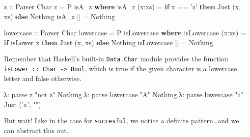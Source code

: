\documentclass[]{article}
\newenvironment{Shaded}{}{}
\newcommand{\KeywordTok}[1]{\textcolor[rgb]{0.00,0.44,0.13}{\textbf{{#1}}}}
\newcommand{\DataTypeTok}[1]{\textcolor[rgb]{0.56,0.13,0.00}{{#1}}}
\newcommand{\CharTok}[1]{\textcolor[rgb]{0.25,0.44,0.63}{{#1}}}
\newcommand{\StringTok}[1]{\textcolor[rgb]{0.25,0.44,0.63}{{#1}}}
\newcommand{\OtherTok}[1]{\textcolor[rgb]{0.00,0.44,0.13}{{#1}}}
\newcommand{\FunctionTok}[1]{\textcolor[rgb]{0.02,0.16,0.49}{{#1}}}
\newcommand{\NormalTok}[1]{{#1}}
\begin{document}
\begin{Shaded}
\begin{Highlighting}[]
\OtherTok{z ::} \DataTypeTok{Parser} \DataTypeTok{Char}
\NormalTok{z }\FunctionTok{=} \DataTypeTok{P} \NormalTok{isA_z}
    \KeywordTok{where}
        \NormalTok{isA_z (x}\FunctionTok{:}\NormalTok{xs) }\FunctionTok{=}  \KeywordTok{if} \NormalTok{x }\FunctionTok{==} \CharTok{'z'}
                            \KeywordTok{then} \DataTypeTok{Just} \NormalTok{(x, xs)}
                            \KeywordTok{else} \DataTypeTok{Nothing}
        \NormalTok{isA_z []     }\FunctionTok{=}  \DataTypeTok{Nothing}

\OtherTok{lowercase ::} \DataTypeTok{Parser} \DataTypeTok{Char}
\NormalTok{lowercase }\FunctionTok{=} \DataTypeTok{P} \NormalTok{isLowercase}
    \KeywordTok{where}
        \NormalTok{isLowercase (x}\FunctionTok{:}\NormalTok{xs)  }\FunctionTok{=}   \KeywordTok{if} \NormalTok{isLower x}
                                    \KeywordTok{then} \DataTypeTok{Just} \NormalTok{(x, xs)}
                                    \KeywordTok{else} \DataTypeTok{Nothing}
        \NormalTok{isLowercase []      }\FunctionTok{=}   \DataTypeTok{Nothing}
\end{Highlighting}
\end{Shaded}

Remember that Haskell's built-in \texttt{Data.Char} module provides the
function \texttt{isLower\ ::\ Char\ -\textgreater{}\ Bool}, which is
true if the given character is a lowercase letter and false otherwise.

\begin{Shaded}
\begin{Highlighting}[]
\NormalTok{λ}\FunctionTok{:} \NormalTok{parse z }\StringTok{"not z"}
\DataTypeTok{Nothing}
\NormalTok{λ}\FunctionTok{:} \NormalTok{parse lowercase }\StringTok{"A"}
\DataTypeTok{Nothing}
\NormalTok{λ}\FunctionTok{:} \NormalTok{parse lowercase }\StringTok{"a"}
\DataTypeTok{Just} \NormalTok{(}\CharTok{'a'}\NormalTok{, }\StringTok{""}\NormalTok{)}
\end{Highlighting}
\end{Shaded}

But wait! Like in the case for \texttt{succesful}, we notice a definite
pattern\ldots{}and we can abstract this out.
\end{document}
